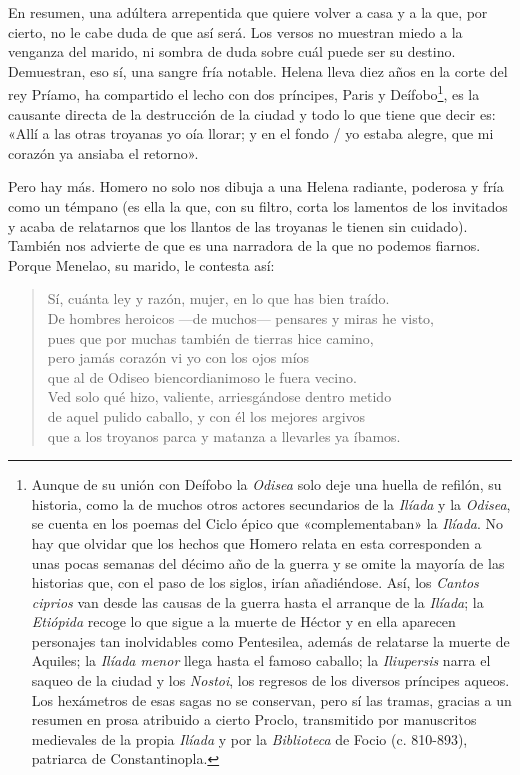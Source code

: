 \documentclass[11pt,a4paper]{article}
\begin{document}
En resumen, una adúltera arrepentida que quiere volver a casa y a la que, por cierto, no le cabe duda de que así será. Los versos no muestran miedo a la venganza del marido, ni sombra de duda sobre cuál puede ser su destino. Demuestran, eso sí, una sangre fría notable. Helena lleva diez años en la corte del rey Príamo, ha compartido el lecho con dos príncipes, Paris y Deífobo\footnote{Aunque de su unión con Deífobo la \emph{Odisea} solo deje una huella de refilón, su historia, como la de muchos otros actores secundarios de la \emph{Ilíada} y la \emph{Odisea}, se cuenta en los poemas del Ciclo épico que «complementaban» la \emph{Ilíada}. No hay que olvidar que los hechos que Homero relata en esta corresponden a unas pocas semanas del décimo año de la guerra y se omite la mayoría de las historias que, con el paso de los siglos, irían añadiéndose. Así, los \emph{Cantos ciprios} van desde las causas de la guerra hasta el arranque de la \emph{Ilíada}; la \emph{Etiópida} recoge lo que sigue a la muerte de Héctor y en ella aparecen personajes tan inolvidables como Pentesilea, además de relatarse la muerte de Aquiles; la \emph{Ilíada menor} llega hasta el famoso caballo; la \emph{Iliupersis} narra el saqueo de la ciudad y los \emph{Nostoi}, los regresos de los diversos príncipes aqueos. Los hexámetros de esas sagas no se conservan, pero sí las tramas, gracias a un resumen en prosa atribuido a cierto Proclo, transmitido por manuscritos medievales de la propia \emph{Ilíada} y por la \emph{Biblioteca} de Focio (c. 810-893), patriarca de Constantinopla.}, es la causante directa de la destrucción de la ciudad y todo lo que tiene que decir es: «Allí a las otras troyanas yo oía llorar; y en el fondo / yo estaba alegre, que mi corazón ya ansiaba el retorno».

Pero hay más. Homero no solo nos dibuja a una Helena radiante, poderosa y fría como un témpano (es ella la que, con su filtro, corta los lamentos de los invitados y acaba de relatarnos que los llantos de las troyanas le tienen sin cuidado). También nos advierte de que es una narradora de la que no podemos fiarnos. Porque Menelao, su marido, le contesta así:

\begin{verse}
Sí, cuánta ley y razón, mujer, en lo que has bien traído.\\
De hombres heroicos ---de muchos--- pensares y miras he visto,\\
pues que por muchas también de tierras hice camino,\\
pero jamás corazón vi yo con los ojos míos\\
que al de Odiseo biencordianimoso le fuera vecino.\\
Ved solo qué hizo, valiente, arriesgándose dentro metido\\
de aquel pulido caballo, y con él los mejores argivos\\
que a los troyanos parca y matanza a llevarles ya íbamos.
\end{verse}
\end{document}
